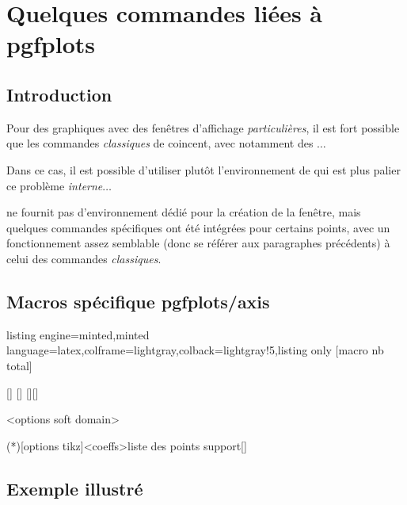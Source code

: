 \documentclass[11pt,a4paper]{ltxdoc}
\begin{document}
\newpage

\section{Quelques commandes liées à pgfplots}

\subsection{Introduction}

Pour des graphiques avec des fenêtres d'affichage \textit{particulières}, il est fort possible que les commandes \textit{classiques} de  coincent, avec notamment des $\ldots$

\smallskip

Dans ce cas, il est possible d'utiliser plutôt l'environnement  de  qui est plus palier ce problème \textit{interne}$\ldots$

 ne fournit pas d'environnement dédié pour la création de la fenêtre, mais quelques commandes spécifiques ont été intégrées pour certains points, avec un fonctionnement assez semblable (donc se référer aux paragraphes précédents) à celui des commandes \textit{classiques}.

\subsection{Macros spécifique pgfplots/axis}

\begin{tcblisting}{listing engine=minted,minted language=latex,colframe=lightgray,colback=lightgray!5,listing only}
[macro nb total]

[\myxcoord]
[\myycoord]
[\myxcoord][\myycoord]

<options soft domain>

\addplotspline(*)[options tikz]<coeffs>{liste des points support}[\monspline]
\end{tcblisting}

\subsection{Exemple illustré}
\end{document}
